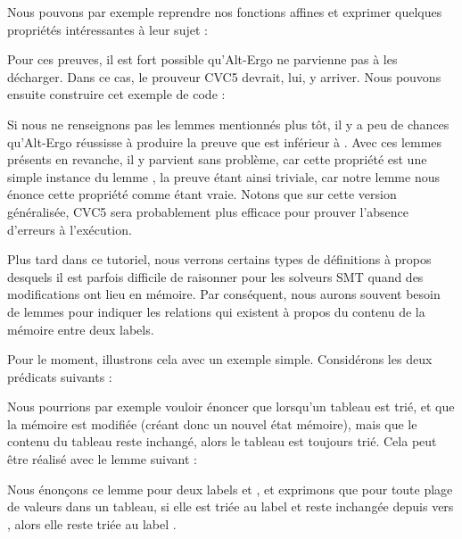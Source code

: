 

Nous pouvons par exemple reprendre nos fonctions affines et exprimer quelques
propriétés intéressantes à leur sujet :






Pour ces preuves, il est fort possible qu'Alt-Ergo ne parvienne pas à les
décharger. Dans ce cas, le prouveur CVC5 devrait, lui, y arriver. Nous pouvons
ensuite construire cet exemple de code :






Si nous ne renseignons pas les lemmes mentionnés plus tôt, il y a peu de chances
qu'Alt-Ergo réussisse à produire la preuve que  est inférieur à .
Avec ces lemmes présents en revanche, il y parvient sans problème, car cette
propriété est une simple instance du lemme , la preuve
étant ainsi triviale, car notre lemme nous énonce cette propriété comme étant vraie.
Notons que sur cette version généralisée, CVC5 sera probablement plus efficace pour
prouver l'absence d'erreurs à l'exécution.





Plus tard dans ce tutoriel, nous verrons certains types de définitions à propos
desquels il est parfois difficile de raisonner pour les solveurs SMT quand des
modifications ont lieu en mémoire. Par conséquent, nous aurons souvent besoin de
lemmes pour indiquer les relations qui existent à propos du contenu de la mémoire
entre deux labels.


Pour le moment, illustrons cela avec un exemple simple. Considérons les deux
prédicats suivants :




Nous pourrions par exemple vouloir énoncer que lorsqu'un tableau est trié, et que
la mémoire est modifiée (créant donc un nouvel état mémoire), mais que le contenu du
tableau reste inchangé, alors le tableau est toujours trié. Cela peut être réalisé
avec le lemme suivant :




Nous énonçons ce lemme pour deux labels  et , et
exprimons que pour toute plage de valeurs dans un tableau, si elle est triée au label
 et reste inchangée depuis  vers ,
alors elle reste triée au label .


